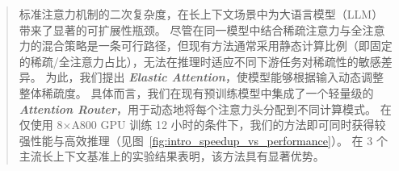 \documentclass{article}
\theoremstyle{plain}
\theoremstyle{definition}
\theoremstyle{remark}
\begin{document}
\printAffiliationsAndNotice{}  %

\begin{abstract}
标准注意力机制的二次复杂度，在长上下文场景中为大语言模型（LLM）带来了显著的可扩展性瓶颈。
尽管在同一模型中结合稀疏注意力与全注意力的混合策略是一条可行路径，但现有方法通常采用静态计算比例（即固定的稀疏/全注意力占比），无法在推理时适应不同下游任务对稀疏性的敏感差异。
为此，我们提出 \emph{\textbf{Elastic Attention}}，使模型能够根据输入动态调整整体稀疏度。
具体而言，我们在现有预训练模型中集成了一个轻量级的 \emph{\textbf{Attention Router}}，用于动态地将每个注意力头分配到不同计算模式。
在仅使用 8$\times$A800 GPU 训练 12 小时的条件下，我们的方法即可同时获得较强性能与高效推理（见图~\ref{fig:intro_speedup_vs_performance}）。
在 3 个主流长上下文基准上的实验结果表明，该方法具有显著优势。

\end{abstract}












\newpage
\appendix
\onecolumn



\end{document}
